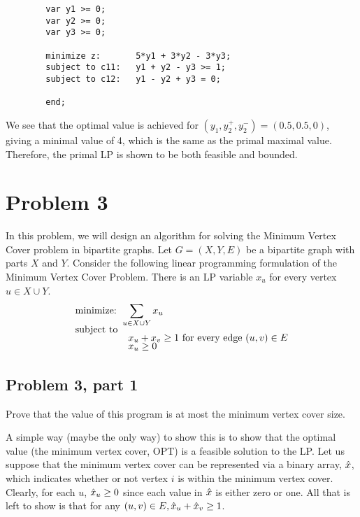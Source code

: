 \begin{solution}
\begin{enumerate}
        \begin{lstlisting}
        var y1 >= 0; 
        var y2 >= 0; 
        var y3 >= 0;
        
        minimize z:       5*y1 + 3*y2 - 3*y3;
        subject to c11:   y1 + y2 - y3 >= 1;
        subject to c12:   y1 - y2 + y3 = 0;
        
        end;   
        \end{lstlisting}

        We see that the optimal value is achieved for $(y_1, y_2^+, y_2^-) = (0.5, 0.5, 0)$, giving a minimal value of 4, which is the same as the primal maximal value. Therefore, the primal LP is shown to be both feasible and bounded.
    \end{enumerate}
    
\end{solution}
\newpage
\section{Problem 3}
In this problem, we will design an algorithm for solving the Minimum Vertex Cover problem in bipartite graphs. Let $G = (X, Y, E)$ be a bipartite graph with parts $X$ and $Y$. Consider the following linear programming formulation of the Minimum Vertex Cover Problem. There is an LP variable $x_u$ for every vertex $ u \in X \cup Y$.
\begin{align*}
    &\text{minimize: } \sum_{u \in X\cup Y} x_u\\[-1.5ex]
    &\text{subject to}\\[-1.5ex]
    &\hspace{19mm} x_u + x_v \geq 1 \text{ for every edge } (u, v) \in E\\[-1.5ex]
    &\hspace{19mm} x_u \geq 0
\end{align*}

\subsection{Problem 3, part 1}
Prove that the value of this program is at most the minimum vertex cover size.
\partbreak
\begin{solution}

    A simple way (maybe the only way) to show this is to show that the optimal value (the minimum vertex cover, OPT) is a feasible solution to the LP. Let us suppose that the minimum vertex cover can be represented via a binary array, $\hat{x}$, which indicates whether or not vertex $i$ is within the minimum vertex cover. Clearly, for each $u$, $\hat{x}_u \geq 0$ since each value in $\hat{x}$ is either zero or one. All that is left to show is that for any $(u, v) \in E, \hat{x}_u + \hat{x}_v \geq 1$.  
    
\end{solution}

